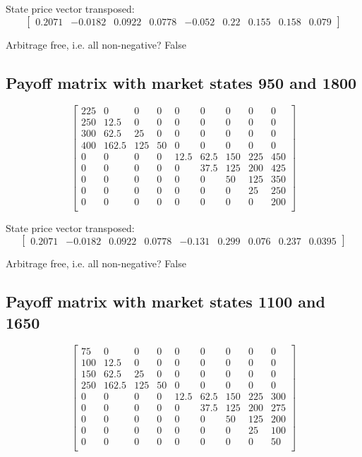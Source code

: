 \documentclass{article}
\begin{document}
State price vector transposed: \[
    \begin{bmatrix} 0.2071 & -0.0182 & 0.0922 & 0.0778 & -0.052 & 0.22 & 0.155 & 0.158 & 0.079 \end{bmatrix}
\]

Arbitrage free, i.e. all non-negative? False

\subsection{Payoff matrix with market states 950 and 1800}
\[
    \begin{bmatrix}
        225 & 0     & 0   & 0  & 0    & 0    & 0   & 0   & 0   \\
        250 & 12.5  & 0   & 0  & 0    & 0    & 0   & 0   & 0   \\
        300 & 62.5  & 25  & 0  & 0    & 0    & 0   & 0   & 0   \\
        400 & 162.5 & 125 & 50 & 0    & 0    & 0   & 0   & 0   \\
        0   & 0     & 0   & 0  & 12.5 & 62.5 & 150 & 225 & 450 \\
        0   & 0     & 0   & 0  & 0    & 37.5 & 125 & 200 & 425 \\
        0   & 0     & 0   & 0  & 0    & 0    & 50  & 125 & 350 \\
        0   & 0     & 0   & 0  & 0    & 0    & 0   & 25  & 250 \\
        0   & 0     & 0   & 0  & 0    & 0    & 0   & 0   & 200 \\
    \end{bmatrix}
\]

State price vector transposed: \[
    \begin{bmatrix} 0.2071 & -0.0182 & 0.0922 & 0.0778 & -0.131 & 0.299 & 0.076 & 0.237 & 0.0395 \end{bmatrix}
\]

Arbitrage free, i.e. all non-negative? False

\subsection{Payoff matrix with market states 1100 and 1650}
\[
    \begin{bmatrix}
        75  & 0     & 0   & 0  & 0    & 0    & 0   & 0   & 0   \\
        100 & 12.5  & 0   & 0  & 0    & 0    & 0   & 0   & 0   \\
        150 & 62.5  & 25  & 0  & 0    & 0    & 0   & 0   & 0   \\
        250 & 162.5 & 125 & 50 & 0    & 0    & 0   & 0   & 0   \\
        0   & 0     & 0   & 0  & 12.5 & 62.5 & 150 & 225 & 300 \\
        0   & 0     & 0   & 0  & 0    & 37.5 & 125 & 200 & 275 \\
        0   & 0     & 0   & 0  & 0    & 0    & 50  & 125 & 200 \\
        0   & 0     & 0   & 0  & 0    & 0    & 0   & 25  & 100 \\
        0   & 0     & 0   & 0  & 0    & 0    & 0   & 0   & 50  \\
    \end{bmatrix}
\]
\end{document}
